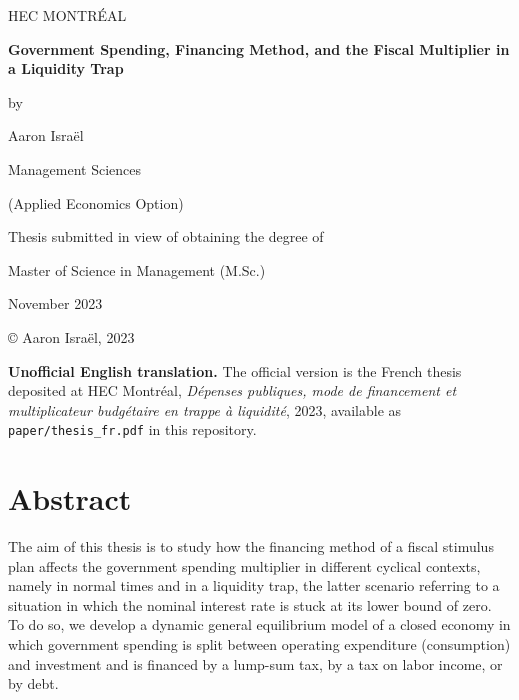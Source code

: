 \documentclass[12pt,letterpaper]{article}
\begin{document}
\begin{titlepage}
\centering
{\large HEC MONTR\'EAL\par}
\vspace{2cm}
{\LARGE\bfseries Government Spending, Financing Method, and the Fiscal Multiplier in a Liquidity Trap\par}
\vspace{1cm}
by\par
\vspace{0.3cm}
{\large Aaron Isra\"el\par}
\vspace{1.5cm}
Management Sciences\par
(Applied Economics Option)\par
\vspace{1.5cm}
Thesis submitted in view of obtaining the degree of\par
Master of Science in Management (M.Sc.)\par
\vspace{1.5cm}
November 2023\par
\copyright{} Aaron Isra\"el, 2023\par
\vfill
{\small \textbf{Unofficial English translation.} The official version is the French thesis deposited at HEC Montr\'eal,
\emph{D\'epenses publiques, mode de financement et multiplicateur budg\'etaire en trappe \`a liquidit\'e},
2023, available as \texttt{paper/thesis\_fr.pdf} in this repository.\par}
\end{titlepage}

\setcounter{page}{3}

\section*{Abstract}

The aim of this thesis is to study how the financing method of a fiscal stimulus plan affects the government spending multiplier in different cyclical contexts, namely in normal times and in a liquidity trap, the latter scenario referring to a situation in which the nominal interest rate is stuck at its lower bound of zero. To do so, we develop a dynamic general equilibrium model of a closed economy in which government spending is split between operating expenditure (consumption) and investment and is financed by a lump-sum tax, by a tax on labor income, or by debt.
\end{document}
